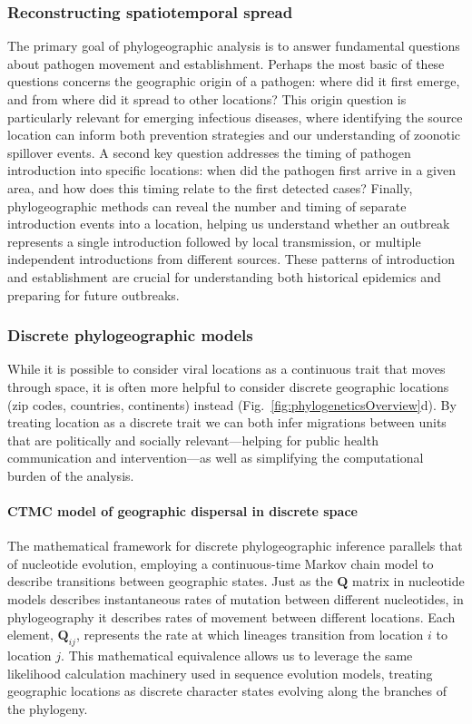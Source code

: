\subsubsection{Reconstructing spatiotemporal spread}
The primary goal of phylogeographic analysis is to answer fundamental questions about pathogen movement and establishment.
Perhaps the most basic of these questions concerns the geographic origin of a pathogen: where did it first emerge, and from where did it spread to other locations?
This origin question is particularly relevant for emerging infectious diseases, where identifying the source location can inform both prevention strategies and our understanding of zoonotic spillover events.
A second key question addresses the timing of pathogen introduction into specific locations: when did the pathogen first arrive in a given area, and how does this timing relate to the first detected cases?
Finally, phylogeographic methods can reveal the number and timing of separate introduction events into a location, helping us understand whether an outbreak represents a single introduction followed by local transmission, or multiple independent introductions from different sources.
These patterns of introduction and establishment are crucial for understanding both historical epidemics and preparing for future outbreaks.

\subsubsection{Discrete phylogeographic models}
While it is possible to consider viral locations as a continuous trait that moves through space, it is often more helpful to consider discrete geographic locations (zip codes, countries, continents) instead (Fig.~\ref{fig:phylogeneticsOverview}d).
By treating location as a discrete trait we can both infer migrations between units that are politically and socially relevant---helping for public health communication and intervention---as well as simplifying the computational burden of the analysis.

\paragraph*{CTMC model of geographic dispersal in discrete space}
The mathematical framework for discrete phylogeographic inference parallels that of nucleotide evolution, employing a continuous-time Markov chain model to describe transitions between geographic states.
Just as the $\mathbf{Q}$ matrix in nucleotide models describes instantaneous rates of mutation between different nucleotides, in phylogeography it describes rates of movement between different locations.
Each element, $\mathbf{Q}_{ij}$, represents the rate at which lineages transition from location $i$ to location $j$.
This mathematical equivalence allows us to leverage the same likelihood calculation machinery used in sequence evolution models, treating geographic locations as discrete character states evolving along the branches of the phylogeny.

